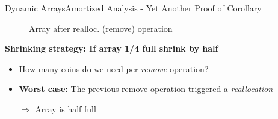 
\begin{frame}{Dynamic Arrays}{Amortized Analysis -
    Yet Another Proof of Corollary}
  \vspace{-2.0em}
  \begin{figure}[!h]%
    \def\FSAsize{14}\def\FSAelements{0}%
    \def\FSAcopy{7}\def\FSAdelete{1}\def\FSAinsert{0}%
    \def\FSAcopyarrow{1}%
    \def\FSAinsertarrow{1}%
    \def\FSAlabelsize{\raisebox{1.75em}{$\begin{array}{c}
        {\color{MainA}s_{i-1}-1}\\
        \text{old elements}
        \end{array}$}}%
    \def\FSAlabelinsertcapacity{removed elements}%
    \def\FSAlabelcapacity{${\color{MainA}c_i}
      = \frac{1}{2} \cdot {\color{MainA}c_{i-1}}$}%
    \vspace{-0.5em}%
    \caption{Array after realloc. (remove) operation}
    \label{fig:dynamic_fields:amortized_analysis:yapoc_array_shrink}
  \end{figure}
  \vspace*{-1.0em}
    \textbf{Shrinking strategy: If array 1/4 full shrink by half}
  \begin{itemize}
  \item
    How many coins do we need per \textit{remove} operation?
  \item
    \textbf{Worst case:}
    The previous remove operation triggered a \textit{reallocation}
  \item[$\Rightarrow$]
    Array is half full
  \end{itemize}
\end{frame}


